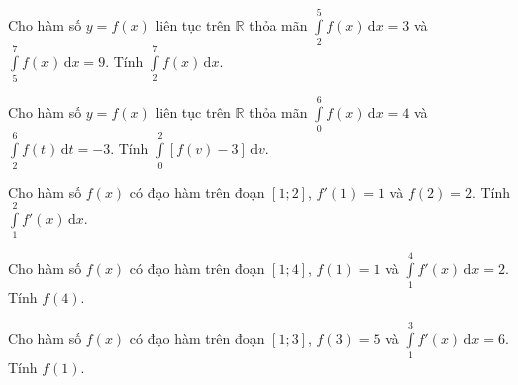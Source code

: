 \begin{bt}%
	\begin{enumEX}{1}
		\item Cho hàm số $ y=f(x) $ liên tục trên $ \mathbb{R} $ thỏa mãn $ \displaystyle\int\limits_2^5 f(x)\mathrm{\,d}x =3$ và $ \displaystyle\int\limits_5^7 f(x)\mathrm{\,d}x =9$. Tính $ \displaystyle\int\limits_2^7 f(x)\mathrm{\,d}x $.
		\item Cho hàm số $ y=f(x) $ liên tục trên $ \mathbb{R} $ thỏa mãn $ \displaystyle\int\limits_0^6 f(x)\mathrm{\,d}x =4$ và $ \displaystyle\int\limits_2^6 f(t)\mathrm{\,d}t =-3$. Tính $ \displaystyle\int\limits_0^2 [f(v)-3]\mathrm{\,d}v $.
	\end{enumEX}
\end{bt}
\begin{bt}%
	\begin{enumEX}{1}
		\item Cho hàm số $ f(x) $ có đạo hàm trên đoạn $ [1;2] $, $ f'(1) =1$ và $ f(2)=2 $. Tính $ \displaystyle\int\limits_1^2 f'(x)\mathrm{\,d}x $.
		\item Cho hàm số $ f(x) $ có đạo hàm trên đoạn $ [1;4] $, $ f(1) =1$ và $ \displaystyle\int\limits_1^4 f'(x)\mathrm{\,d}x =2$. Tính $ f(4) $.
		\item Cho hàm số $ f(x) $ có đạo hàm trên đoạn $ [1;3] $, $ f(3) =5$ và $ \displaystyle\int\limits_1^3 f'(x)\mathrm{\,d}x =6$. Tính $ f(1) $.
		
	\end{enumEX}
\end{bt}
